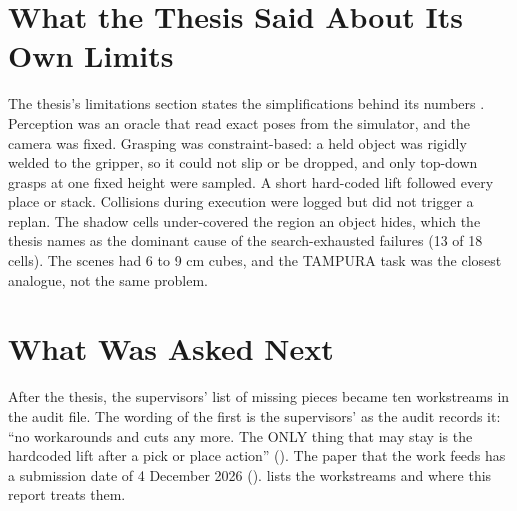 \section{What the Thesis Said About Its Own Limits}
\label{sec:thesis-limits}

The thesis's limitations section states the simplifications behind its numbers
\cite{alassiri2026thesis}. Perception was an oracle that read exact poses from
the simulator, and the camera was fixed. Grasping was constraint-based: a held
object was rigidly welded to the gripper, so it could not slip or be dropped,
and only top-down grasps at one fixed height were sampled. A short hard-coded
lift followed every place or stack. Collisions during execution were logged but
did not trigger a replan. The shadow cells under-covered the region an object
hides, which the thesis names as the dominant cause of the search-exhausted
failures (13 of 18 cells). The scenes had 6 to 9 cm cubes, and the TAMPURA task
was the closest analogue, not the same problem.

\section{What Was Asked Next}
\label{sec:asked-next}

After the thesis, the supervisors' list of missing pieces became ten workstreams
in the audit file. The wording of the first is the supervisors' as the audit
records it: ``no workarounds and cuts any more. The ONLY thing that may stay is
the hardcoded lift after a pick or place action'' (). The paper that the
work feeds has a submission date of 4 December 2026 ().
 lists the workstreams and where this report treats them.

